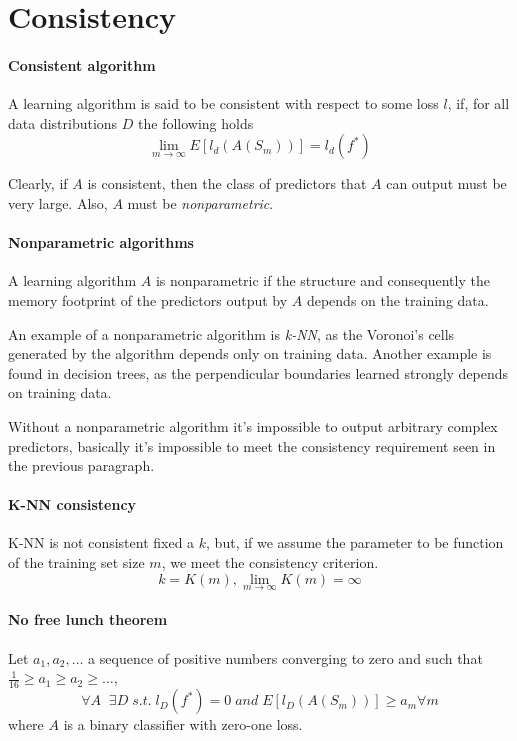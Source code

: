 \section{Consistency}

\paragraph{Consistent algorithm}
A learning algorithm is said to be consistent with respect
to some loss $l$, if, for all data distributions $D$ the following holds 
$$\lim_{m \rightarrow \infty} E[l_d(A(S_m))] = l_d(f^*)$$

Clearly, if $A$ is consistent, then the class of predictors that 
$A$ can output must be very large.
Also, $A$ must be \emph{nonparametric}.

\paragraph{Nonparametric algorithms}
A learning algorithm $A$ is nonparametric if the structure 
and consequently the memory footprint of the 
predictors output by $A$ depends on the training data.

An example of a nonparametric algorithm is \emph{k-NN}, 
as the Voronoi's cells generated by the algorithm depends 
only on training data.
Another example is found in decision trees, as the perpendicular 
boundaries learned strongly depends on training data. 

\begin{remark}
    Without a nonparametric algorithm it's impossible to output arbitrary 
    complex predictors, basically it's impossible to meet the consistency 
    requirement seen in the previous paragraph.
\end{remark}

\paragraph{K-NN consistency}
K-NN is not consistent fixed a $k$, but, if we assume the parameter 
to be function of the training set size $m$, we meet the consistency criterion.
$$k = K(m), \lim_{m\rightarrow \infty} K(m) = \infty$$

\paragraph{No free lunch theorem}
Let $a_1, a_2, \dots$ a sequence of positive numbers converging to zero
and such that $\frac{1}{16} \geq a_1 \geq a_2 \geq \dots$, 
$$\forall A\;\;\exists D \mathit{\;s. t.\;} l_D(f^*) = 0 \mathit{\;and\;} E[l_D(A(S_m))] \geq a_m
\forall m$$
where $A$ is a binary classifier with zero-one loss.

